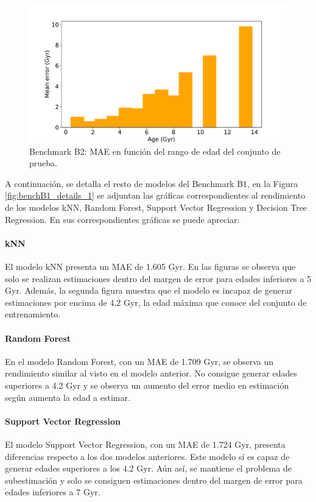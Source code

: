 \begin{figure}[H]
\begin{center}
 \includegraphics[width=0.8\linewidth]{Figuras/Experimentos/B_B2_bayes_3.pdf}
\end{center}
\caption{Benchmark B2: MAE en función del rango de edad del conjunto de prueba.}
 \label{fig:benchB2_best_3}
\end{figure}

A continuación, se detalla el resto de modelos del Benchmark B1, en la Figura \ref{fig:benchB1_details_1} se adjuntan las gráficas correspondientes al rendimiento de los modelos kNN, Random Forest, Support Vector Regression y Decision Tree Regression. En sus correspondientes gráficas se puede apreciar:

\paragraph{kNN} 
El modelo kNN presenta un MAE de 1.605 Gyr. En las figuras se observa que solo se realizan estimaciones dentro del margen de error para edades inferiores a 5 Gyr. Además, la segunda figura muestra que el modelo es incapaz de generar estimaciones por encima de 4.2 Gyr, la edad máxima que conoce del conjunto de entrenamiento.  %

\paragraph{Random Forest} 
En el modelo Random Forest, con un MAE de 1.709 Gyr, se observa un rendimiento similar al visto en el modelo anterior. No consigue generar edades superiores a 4.2 Gyr y se observa un aumento del error medio en estimación según aumenta la edad a estimar. %

\paragraph{Support Vector Regression} 
El modelo Support Vector Regression, con un MAE de 1.724 Gyr, presenta diferencias respecto a los dos modelos anteriores. Este modelo sí es capaz de generar edades superiores a los 4.2 Gyr. Aún así, se mantiene el problema de subestimación y solo se consiguen estimaciones dentro del margen de error para edades inferiores a 7 Gyr. %

